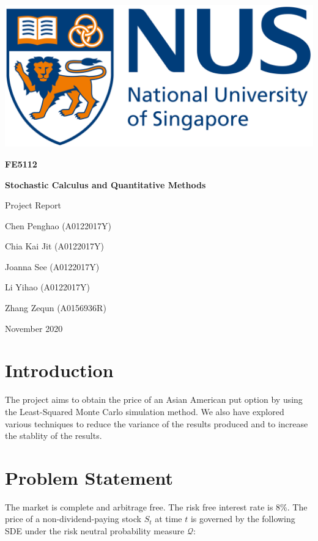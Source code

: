 \documentclass[12pt]{article}
\begin{document}
\begin{titlepage}
\centering
{
	\includegraphics[scale=0.08]{./media/0.png}\\
	\vfill
	{\Large \textbf{FE5112}\par}
	{\Large \textbf{Stochastic Calculus and Quantitative Methods}\par}
	{\Large Project Report\par}
	\vfill
	{\normalsize Chen Penghao (A0122017Y)\par}
	{\normalsize Chia Kai Jit (A0122017Y)\par}
	{\normalsize Joanna See (A0122017Y)\par}
	{\normalsize Li Yihao (A0122017Y)\par}
	{\normalsize Zhang Zequn (A0156936R)\par}
	\vfill
	{ November 2020\par}
}
\end{titlepage}

\section{Introduction}
The project aims to obtain the price of an Asian American put option by using the Least-Squared Monte Carlo simulation method.  We also have explored various techniques to reduce the variance of the results produced and to increase the stablity of the results.

\section{Problem Statement}

The market is complete and arbitrage free. The risk free interest rate is 8\%. The price of a non-dividend-paying stock $S_t$ at time $t$ is governed by the following SDE under the risk neutral probability measure $\mathcal{Q}$:
\end{document}
